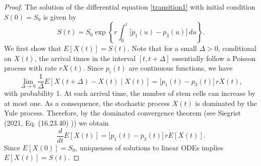 \documentclass[pdflatex,sn-mathphys-num]{sn-jnl}
\theoremstyle{thmstyleone}%
\theoremstyle{thmstyletwo}%
\theoremstyle{thmstylethree}%
\begin{document}
\begin{proof}
The solution of the differential equation \eqref{transition1} with initial condition
$S(0)=S_0$ is given by
\begin{equation}
\label{eq:S_solution}
S(t)=S_0 \exp\!\left\{ r\int_0^t \bigl[p_1(u)-p_3(u)\bigr]\,du \right\}.
\end{equation}
We first show that $E[X(t)] = S(t)$. Note that for a small $\Delta>0$, conditional on $X(t)$, the arrival times in the interval $[t, t+\Delta]$ essentially follow a Poisson process with rate $rX(t)$. Since $p_i(t)$ are continuous functions, we have
\begin{equation}
\label{eq:increment_mean}
\lim_{\Delta\to 0}\frac{1}{\Delta}E\!\left[X(t+\Delta)-X(t)\mid X(t)\right]=\bigl[p_1(t)-p_3(t)\bigr]\,rX(t),
\end{equation}
with probability 1.
At each arrival time, the number of stem cells can increase by at most one. As a consequence, the stochastic process $X(t)$ is dominated by the Yule process. Therefore, by the dominated convergence theorem  (see Siegrist (2021, Eq. (16.23.40) \cite{siegrist2021})) we obtain
\begin{equation}
\frac{d}{dt}E[X(t)]
=\bigl[p_1(t)-p_3(t)\bigr]\,rE[X(t)].
\end{equation}
Since $E[X(0)]=S_0$, uniqueness of solutions to linear ODEs implies
$E[X(t)]=S(t)$.


\end{proof}
\end{document}
